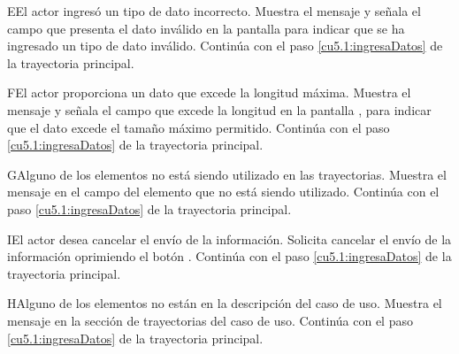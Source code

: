  \begin{UCtrayectoriaA}{E}{El actor ingresó un tipo de dato incorrecto.}
    \UCpaso[\UCsist] Muestra el mensaje  y señala el campo que presenta el dato inválido en la 
    pantalla  para indicar que se ha ingresado un tipo de dato inválido.
    \UCpaso[] Continúa con el paso \ref{cu5.1:ingresaDatos} de la trayectoria principal.
 \end{UCtrayectoriaA}
 \begin{UCtrayectoriaA}{F}{El actor proporciona un dato que excede la longitud máxima.}
    \UCpaso[\UCsist] Muestra el mensaje  y señala el campo que excede la 
    longitud en la pantalla , para indicar que el dato excede el tamaño máximo permitido.
    \UCpaso[] Continúa con el paso \ref{cu5.1:ingresaDatos} de la trayectoria principal.
 \end{UCtrayectoriaA}
 \begin{UCtrayectoriaA}{G}{Alguno de los elementos no está siendo utilizado en las trayectorias.}
    \UCpaso[\UCsist] Muestra el mensaje  en el campo del elemento
    que no está siendo utilizado.
    \UCpaso[] Continúa con el paso \ref{cu5.1:ingresaDatos} de la trayectoria principal.
 \end{UCtrayectoriaA}
 
 \begin{UCtrayectoriaA}{I}{El actor desea cancelar el envío de la información.}
    \UCpaso[\UCactor] Solicita cancelar el envío de la información oprimiendo el botón .
    \UCpaso[] Continúa con el paso \ref{cu5.1:ingresaDatos} de la trayectoria principal.
 \end{UCtrayectoriaA}
 
 \begin{UCtrayectoriaA}{H}{Alguno de los elementos no están en la descripción del caso de uso.}
    \UCpaso[\UCsist] Muestra el mensaje  en la sección de trayectorias del caso de uso.
    \UCpaso[] Continúa con el paso \ref{cu5.1:ingresaDatos} de la trayectoria principal.
 \end{UCtrayectoriaA}
 
